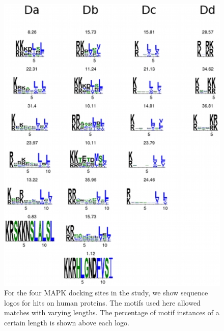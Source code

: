 
\begin{figure}
\begin{center}
\includegraphics[scale=0.75]{figs/plos1_2}
\end{center}
\caption[Human sequence logos for MAPK docking site hits]{\small For
  the four MAPK docking sites in the study, we show sequence logos for
  hits on human proteins. The motifs used here allowed matches with
  varying lengths. The percentage of motif instances of a certain
  length is shown above each logo. \label{fig:plos1:fig2}}
\end{figure}

